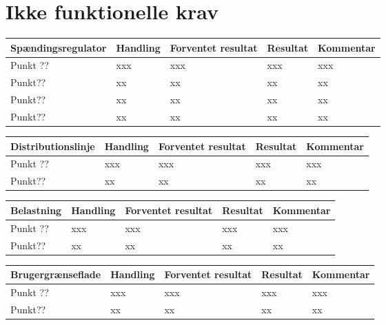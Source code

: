 \section{Ikke funktionelle krav}
\begin{table}[htbp]
	\centering
	\begin{tabular}{|p{4cm}|p{3cm}|p{4cm}|p{2cm}|p{2.5cm}|}
		\hline
		\textbf{Spændingsregulator} & \textbf{Handling} & \textbf{Forventet resultat} & \textbf{Resultat} &\textbf{Kommentar} \\\hline
		Punkt ?? & xxx & xxx & xxx & xxx \\\hline
		Punkt?? & xx & xx & xx & xx \\\hline
		Punkt?? & xx & xx & xx & xx \\\hline
		Punkt?? & xx & xx & xx & xx \\\hline
		

	\end{tabular}

	
\end{table}

\begin{table}[htbp]
	\centering
	\begin{tabular}{|p{4cm}|p{3cm}|p{4cm}|p{2cm}|p{2.5cm}|}
		\hline
		\textbf{Distributionslinje} & \textbf{Handling} & \textbf{Forventet resultat} & \textbf{Resultat} &\textbf{Kommentar} \\\hline
		Punkt ?? & xxx & xxx & xxx & xxx \\\hline
		 Punkt?? & xx & xx & xx & xx \\\hline
		
		
	\end{tabular}

	
\end{table}
\begin{table}[htbp]
	\centering
	\begin{tabular}{|p{4cm}|p{3cm}|p{4cm}|p{2cm}|p{2.5cm}|}
		\hline
		\textbf{Belastning} & \textbf{Handling} & \textbf{Forventet resultat} & \textbf{Resultat} &\textbf{Kommentar} \\\hline
		Punkt ?? & xxx & xxx & xxx & xxx \\\hline
		Punkt?? & xx & xx & xx & xx \\\hline
		
	\end{tabular}

	
\end{table}
\begin{table}[htbp]
	\centering
	\begin{tabular}{|p{4cm}|p{3cm}|p{4cm}|p{2cm}|p{2.5cm}|}
		\hline
		\textbf{Brugergrænseflade} & \textbf{Handling} & \textbf{Forventet resultat} & \textbf{Resultat} &\textbf{Kommentar} \\\hline
		Punkt ?? & xxx & xxx & xxx & xxx \\\hline
		Punkt?? & xx & xx & xx & xx \\\hline
		
		
	\end{tabular}

	
\end{table}
